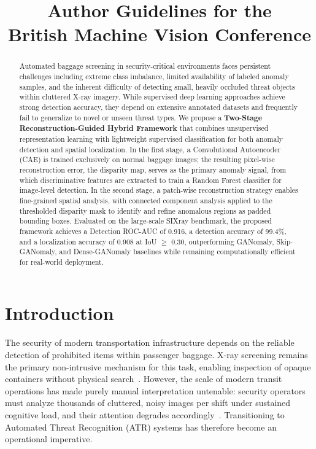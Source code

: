 \documentclass{bmvc2k}
\title{Author Guidelines for the\\ British Machine Vision Conference}
\begin{document}
\maketitle

\begin{abstract}
	Automated baggage screening in security-critical environments faces persistent challenges 
	including extreme class imbalance, limited availability of labeled anomaly samples, and 
	the inherent difficulty of detecting small, heavily occluded threat objects within 
	cluttered X-ray imagery. While supervised deep learning approaches achieve strong 
	detection accuracy, they depend on extensive annotated datasets and frequently fail to 
	generalize to novel or unseen threat types. We propose a \textbf{Two-Stage 
		Reconstruction-Guided Hybrid Framework} that combines unsupervised representation 
	learning with lightweight supervised classification for both anomaly detection and 
	spatial localization. In the first stage, a Convolutional Autoencoder (CAE) is trained 
	exclusively on normal baggage images; the resulting pixel-wise reconstruction error, the disparity map, serves as the primary anomaly signal, from which 
	discriminative features are extracted to train a Random Forest classifier for 
	image-level detection. In the second stage, a patch-wise reconstruction strategy 
	enables fine-grained spatial analysis, with connected component analysis applied to 
	the thresholded disparity mask to identify and refine anomalous regions as padded 
	bounding boxes. Evaluated on the large-scale SIXray benchmark, the proposed framework 
	achieves a Detection ROC-AUC of 0.916, a detection accuracy of 99.4\%, and a 
	localization accuracy of 0.908 at IoU $\geq$ 0.30, outperforming GANomaly, 
	Skip-GANomaly, and Dense-GANomaly baselines while remaining computationally efficient 
	for real-world deployment.
\end{abstract}

\section{Introduction}
\label{sec:intro}

The security of modern transportation infrastructure depends on the reliable detection 
of prohibited items within passenger baggage. X-ray screening remains the primary 
non-intrusive mechanism for this task, enabling inspection of opaque containers without 
physical search~\cite{tackling2016jaccard}. However, the scale of modern transit operations has 
made purely manual interpretation untenable: security operators must analyze thousands 
of cluttered, noisy images per shift under sustained cognitive load, and their attention 
degrades accordingly~\cite{baggage2022abdelfatah}. Transitioning to Automated Threat Recognition 
(ATR) systems has therefore become an operational imperative.
\end{document}
